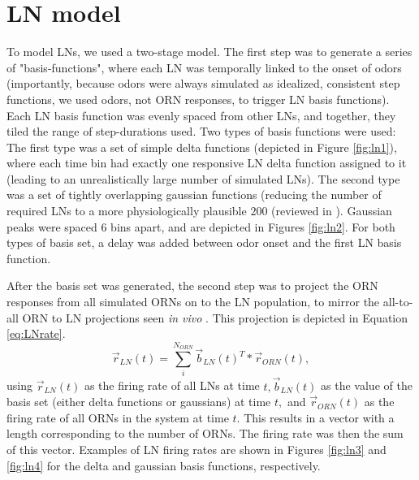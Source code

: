 \documentclass[a4paper,12pt,twoside]{article}
\begin{document}
\section{LN model}
To model LNs, we used a two-stage model.  The first step was to generate a series of "basis-functions", where each LN was temporally linked to the onset of odors (importantly, because odors were always simulated as idealized, consistent step functions, we used odors, not ORN responses, to trigger LN basis functions).  Each LN basis function was evenly spaced from other LNs, and together, they tiled the range of step-durations used.   Two types of basis functions were used: The first type was a set of simple delta functions (depicted in Figure \ref{fig:ln1}), where each time bin had exactly one responsive LN delta function assigned to it (leading to an unrealistically large number of simulated LNs).  The second type was a set of tightly overlapping gaussian functions (reducing the number of required LNs to a more physiologically plausible $200$ (reviewed in \cite{Nagel2016}). Gaussian peaks were spaced $6$ bins apart, and are depicted in Figures \ref{fig:ln2}.  For both types of basis set, a delay was added between odor onset and the first LN basis function.

After the basis set was generated, the second step was to project the ORN responses from all simulated ORNs on to the LN population, to mirror the all-to-all ORN to LN projections seen \textit{in vivo} \cite{Wilson2013}.  This projection is depicted in Equation \ref{eq:LNrate}.
\begin{equation}
\vec{r}_{LN}(t) = \sum\limits_{i} ^{N_{ORN}}{\vec{b}_{LN}(t)^T * \vec{r}_{ORN}(t)},
\label{eq:LNrate}
\end{equation}
using $\vec{r}_{LN}(t)$ as the firing rate of all LNs at time $t, \vec{b}_{LN}(t)$ as the value of the basis set (either delta functions or gaussians) at time $t,$ and $\vec{r}_{ORN}(t)$ as the firing rate of all ORNs in the system at time $t.$  This results in a vector with a length corresponding to the number of ORNs.  The firing rate was then the sum of this vector.  Examples of LN firing rates are shown in Figures \ref{fig:ln3} and \ref{fig:ln4} for the delta and gaussian basis functions, respectively.
\end{document}
